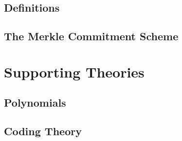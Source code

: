 \section{Definitions}

\section{The Merkle Commitment Scheme}


\chapter{Supporting Theories}\label{chap:supporting_theories}

\section{Polynomials}\label{sec:polynomials}

\begin{definition}
    \label{def:multilinear_extension}
\end{definition}

\begin{theorem}
    \label{thm:multilinear_extension_unique}
\end{theorem}

\section{Coding Theory}\label{sec:coding_theory}

\begin{definition}
    \label{def:code_distance}
\end{definition}

\begin{definition}
    \label{def:distance_from_code}
\end{definition}

\begin{definition}
    \label{def:generator_matrix}
\end{definition}

\begin{definition}
    \label{def:parity_check_matrix}
\end{definition}

